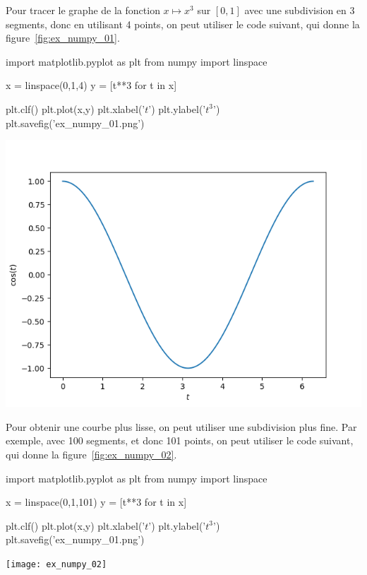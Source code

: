 \begin{exemple}
Pour tracer le graphe de la fonction $x\mapsto x^3$ sur $[0,1]$ avec une subdivision en 3 segments, donc en utilisant 
4 points, on peut utiliser le code suivant, qui donne la figure~\ref{fig:ex_numpy_01}.
\begin{pyverbatim}
import matplotlib.pyplot as plt
from numpy import linspace

x = linspace(0,1,4)
y = [t**3 for t in x]

plt.clf()
plt.plot(x,y)
plt.xlabel('$t$')
plt.ylabel('$t^3$')
plt.savefig('ex_numpy_01.png')
\end{pyverbatim}

  \begin{center}
    \includegraphics[scale = 0.5]{ex_numpy_01}
    \label{fig:ex_numpy_01}
  \end{center}
Pour obtenir une courbe plus lisse, on peut utiliser une subdivision plus fine. Par exemple, avec 100 segments, et donc 101 points, on peut utiliser le code suivant, qui donne la figure~\ref{fig:ex_numpy_02}.
\begin{pyverbatim}
import matplotlib.pyplot as plt
from numpy import linspace

x = linspace(0,1,101)
y = [t**3 for t in x]

plt.clf()
plt.plot(x,y)
plt.xlabel('$t$')
plt.ylabel('$t^3$')
plt.savefig('ex_numpy_01.png')
\end{pyverbatim}

  \begin{center}
    \texttt{[image: ex\_numpy\_02]}
    \label{fig:ex_numpy_02}
  \end{center}
\end{exemple}


